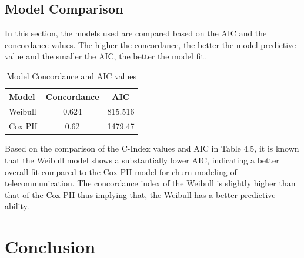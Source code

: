 \documentclass[12pt]{report}
\begin{document}
	\section{Model Comparison}
	
	In this section, the models used are compared based on the AIC and the concordance values. The higher the concordance, the better the model predictive value and the smaller the AIC, the better the model fit.
	
	\begin{table}[H]
		\centering
		\begin{tabular}{lcc}
			\toprule
			\textbf{Model} & \textbf{Concordance} & \textbf{AIC} \\
			\midrule
			Weibull & 0.624 & 815.516 \\
			Cox PH & 0.62 & 1479.47 \\
			\bottomrule
		\end{tabular}
		\caption{Model Concordance and AIC values}
	\end{table}
	
	Based on the comparison of the C-Index values and AIC in Table 4.5, it is known that the Weibull model shows a substantially lower AIC, indicating a better overall fit compared to the Cox PH model for churn modeling of telecommunication. The concordance index of the Weibull is slightly higher than that of the Cox PH thus implying that, the Weibull has a better predictive ability.
	
	\newpage
	\chapter{Conclusion}
	
	
	
	
	
\end{document}
